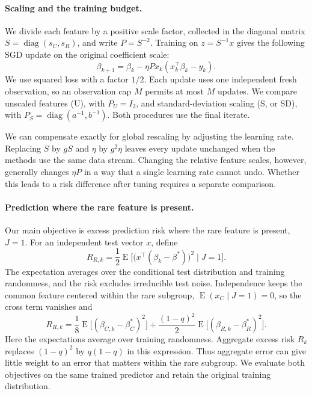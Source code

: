 \documentclass{alt2027}
\DeclareMathOperator{\diag}{diag}
\DeclareMathOperator{\E}{E}
\begin{document}
\paragraph{Scaling and the training budget.}

We divide each feature by a positive scale factor, collected in the diagonal
matrix $S = \diag(s_C,s_R)$, and write $P = S^{-2}$. Training on $z = S^{-1}x$
gives the following SGD update on the original coefficient scale:
\begin{equation}
  \beta_{k+1} = \beta_k - \eta Px_k(x_k^\top\beta_k - y_k).
\end{equation}
We use squared loss with a factor $1/2$. Each update uses one independent fresh
observation, so an observation cap $M$ permits at most $M$ updates. We compare
unscaled features (U), with $P_U = I_2$, and standard-deviation scaling (S, or
SD), with $P_S = \diag(a^{-1},b^{-1})$. Both procedures use the final iterate.

We can compensate exactly for global rescaling by adjusting the learning rate.
Replacing $S$ by $gS$ and $\eta$ by $g^2\eta$ leaves every update unchanged when
the methods use the same data stream. Changing the relative feature scales,
however, generally changes $\eta P$ in a way that a single learning rate cannot
undo. Whether this leads to a risk difference after tuning requires a separate
comparison.

\paragraph{Prediction where the rare feature is present.}

Our main objective is excess prediction risk where the rare feature is present,
$J = 1$. For an independent test vector $x$, define
\[
  R_{R,k} = \frac12\E\bigl[ \bigl(x^\top(\beta_k - \beta^*)\bigr)^2 \mid J = 1 \bigr].
\]
The expectation averages over the conditional test distribution and training
randomness, and the risk excludes irreducible test noise. Independence keeps the
common feature centered within the rare subgroup, $\E(x_C \mid J = 1) = 0$, so
the cross term vanishes and
\begin{equation}
  R_{R,k} = \frac18\E\bigl[(\beta_{C,k} - \beta_C^*)^2\bigr]
            + \frac{(1 - q)^2}{2}\E\bigl[(\beta_{R,k} - \beta_R^*)^2\bigr].
\end{equation}
Here the expectations average over training randomness. Aggregate excess risk
$R_k$ replaces $(1 - q)^2$ by $q(1 - q)$ in this expression. Thus aggregate
error can give little weight to an error that matters within the rare subgroup.
We evaluate both objectives on the same trained predictor and retain the
original training distribution.
\end{document}
